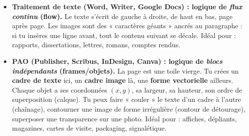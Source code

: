 \documentclass[11pt]{article}
\begin{document}
\begin{propriete}
\begin{itemize}
    \item \textbf{Traitement de texte (Word, Writer, Google Docs) : logique de \emph{flux continu} (flow).} Le texte s'écrit de gauche à droite, de haut en bas, page après page. Les images sont des « caractères géants » ancrés au paragraphe : si tu insères une ligne avant, tout le contenu suivant se décale. Idéal pour : rapports, dissertations, lettres, romans, comptes rendus.
    \item \textbf{PAO (Publisher, Scribus, InDesign, Canva) : logique de \emph{blocs indépendants} (frames/objets).} La page est une toile vierge. Tu crées un \textbf{cadre de texte} ici, un \textbf{cadre image} là, une \textbf{forme vectorielle} ailleurs. Chaque objet a ses coordonnées $(x, y)$, sa largeur, sa hauteur, son ordre de superposition (calque). Tu peux faire « couler » le texte d'un cadre à l'autre (chaînage), contourner une image de forme irrégulière (contour de détourage), superposer une transparence sur une photo. Idéal pour : affiches, dépliants, magazines, cartes de visite, packaging, signalétique.
\end{itemize}
\end{propriete}
\end{document}
